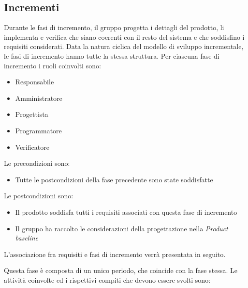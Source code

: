 \documentclass[../piano-di-progetto.tex]{subfiles}
\begin{document}
\subsection{Incrementi}%
\label{sub:incrementi}
Durante le fasi di incremento, il gruppo progetta i dettagli del prodotto, li implementa e verifica che siano coerenti con il resto del sistema e che soddisfino i requisiti considerati.
Data la natura ciclica del modello di sviluppo incrementale, le fasi di incremento hanno tutte la stessa struttura. Per ciascuna fase di incremento i ruoli coinvolti sono:
\begin{itemize}
  \item Responsabile
  \item Amministratore
  \item Progettista
  \item Programmatore
  \item Verificatore
\end{itemize}
Le precondizioni sono:
\begin{itemize}
  \item Tutte le postcondizioni della fase precedente sono state soddisfatte
\end{itemize}
Le postcondizioni sono:
\begin{itemize}
  \item Il prodotto soddisfa tutti i requisiti associati con questa fase di incremento
  \item Il gruppo ha raccolto le considerazioni della progettazione nella \textit{Product baseline}
\end{itemize}
L'associazione fra requisiti e fasi di incremento verrà presentata in seguito.\par
Questa fase è composta di un unico periodo, che coincide con la fase stessa.
Le attività coinvolte ed i rispettivi compiti che devono essere svolti sono:
\end{document}
